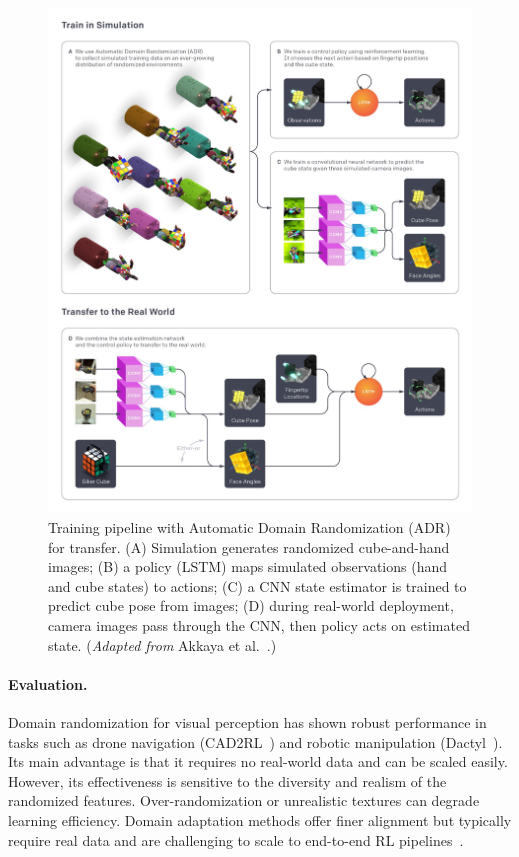 \begin{figure}[H]
    \centering
    \includegraphics[width=0.95\linewidth]{figures/figAdrPipeline.png}
    \caption{Training pipeline with Automatic Domain Randomization (ADR) for \simtoreal transfer. (A) Simulation generates randomized cube-and-hand images; (B) a policy (LSTM) maps simulated observations (hand and cube states) to actions; (C) a CNN state estimator is trained to predict cube pose from images; (D) during real-world deployment, camera images pass through the CNN, then policy acts on estimated state. (\emph{Adapted from} Akkaya et al.~\cite{Akkaya2019}.)}
    \label{fig:adr_pipeline}
\end{figure}

\paragraph{Evaluation.} Domain randomization for visual perception has shown robust performance in tasks such as drone navigation (CAD2RL~\cite{Sadeghi2017}) and robotic manipulation (Dactyl~\cite{Akkaya2019}). Its main advantage is that it requires no real-world data and can be scaled easily. However, its effectiveness is sensitive to the diversity and realism of the randomized features. Over-randomization or unrealistic textures can degrade learning efficiency. Domain adaptation methods offer finer alignment but typically require real data and are challenging to scale to end-to-end RL pipelines~\cite{Tzeng2017}.
